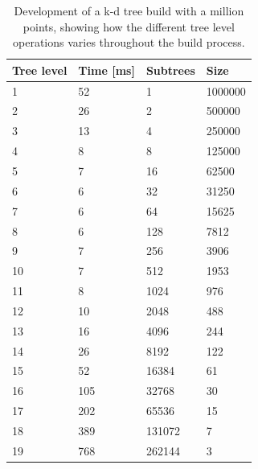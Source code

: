 \begin{table}[ht]
\centering
    \begin{tabular}{|l|l|l|l|}
        \hline
        \textbf{Tree level} & \textbf{Time [ms]} & \textbf{Subtrees} & \textbf{Size}\\ \hline
        1          & 52       & 1                  & 1000000      \\ \hline
        2          & 26       & 2                  & 500000       \\ \hline
        3          & 13       & 4                  & 250000       \\ \hline
        4          & 8        & 8                  & 125000       \\ \hline
        5          & 7        & 16                 & 62500        \\ \hline
        6          & 6        & 32                 & 31250        \\ \hline
        7          & 6        & 64                 & 15625        \\ \hline
        8          & 6        & 128                & 7812         \\ \hline
        9          & 7        & 256                & 3906         \\ \hline
        10         & 7        & 512                & 1953         \\ \hline
        11         & 8        & 1024               & 976          \\ \hline
        12         & 10       & 2048               & 488          \\ \hline
        13         & 16       & 4096               & 244          \\ \hline
        14         & 26       & 8192               & 122          \\ \hline
        15         & 52       & 16384              & 61           \\ \hline
        16         & 105      & 32768              & 30           \\ \hline
        17         & 202      & 65536              & 15           \\ \hline
        18         & 389      & 131072             & 7            \\ \hline
        19         & 768      & 262144             & 3            \\ \hline
    \end{tabular}
    \caption{Development of a k-d tree build with a million points, showing how the different tree level operations varies throughout the build process.}
    \label{tbl:nvprc_balance_branch}
\end{table}

